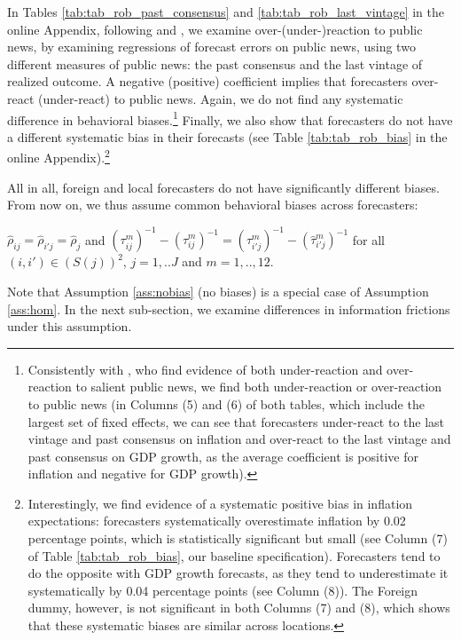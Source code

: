 In Tables \ref{tab:tab_rob_past_consensus} and \ref{tab:tab_rob_last_vintage} in the online Appendix, following \citet{BroerKohlhas2019} and \citet{GemmiValchev2021}, we examine over-(under-)reaction to public news, by examining regressions of forecast errors on public news, using two different measures of public news: the past consensus and the last vintage of realized outcome. A negative (positive) coefficient implies that forecasters over-react (under-react) to public news. Again, we do not find any systematic difference in behavioral biases.\footnote{Consistently with \citet{BroerKohlhas2019}, who find evidence of both under-reaction and over-reaction to salient public news, we find both under-reaction or over-reaction to public news (in Columns (5) and (6) of both tables, which include the largest set of fixed effects, we can see that forecasters under-react to the last vintage and past consensus on inflation and over-react to the last vintage and past consensus on GDP growth, as the average coefficient is positive for inflation and negative for GDP growth).} Finally, we also show that forecasters do not have a different systematic bias in their forecasts (see Table \ref{tab:tab_rob_bias} in the online Appendix).\footnote{Interestingly, we find evidence of a systematic positive bias in inflation expectations: forecasters systematically overestimate inflation by 0.02 percentage points, which is statistically significant but small (see Column (7) of Table \ref{tab:tab_rob_bias}, our baseline specification). Forecasters tend to do the opposite with GDP growth forecasts, as they tend to underestimate it systematically by 0.04 percentage points (see Column (8)). The Foreign dummy, however, is not significant in both Columns (7) and (8), which shows that these systematic biases are similar across locations.}

All in all, foreign and local forecasters do not have significantly different biases. From now on, we thus assume common behavioral biases across forecasters:
\begin{assumption}\label{ass:hom} $\hat\rho_{ij}=\hat\rho_{i'j}=\hat\rho_{j}$ and $(\tau_{ij}^m)^{-1}-(\hat\tau_{ij}^m)^{-1}=(\tau_{i'j}^m)^{-1}-(\hat\tau_{i'j}^m)^{-1}$ for all $(i,i')\in(\textit{S}(j))^2$, $j=1,..J$ and $m=1,..,12$.
\end{assumption}
Note that Assumption \ref{ass:nobias} (no biases)  is a special case of Assumption \ref{ass:hom}.
In the next sub-section, we examine differences in information frictions under this assumption.
